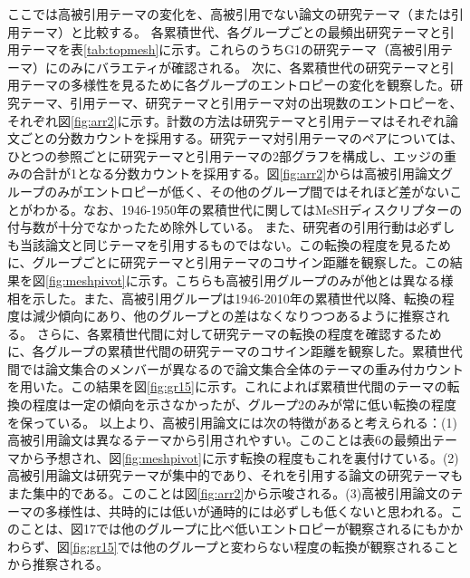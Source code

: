 ここでは高被引用テーマの変化を、高被引用でない論文の研究テーマ（または引用テーマ）と比較する。
各累積世代、各グループごとの最頻出研究テーマと引用テーマを表\ref{tab:topmesh}に示す。これらのうちG1の研究テーマ（高被引用テーマ）にのみにバラエティが確認される。
次に、各累積世代の研究テーマと引用テーマの多様性を見るために各グループのエントロピーの変化を観察した。研究テーマ、引用テーマ、研究テーマと引用テーマ対の出現数のエントロピーを、それぞれ図\ref{fig:arr2}に示す。計数の方法は研究テーマと引用テーマはそれぞれ論文ごとの分数カウントを採用する。研究テーマ対引用テーマのペアについては、ひとつの参照ごとに研究テーマと引用テーマの2部グラフを構成し、エッジの重みの合計が1となる分数カウントを採用する。図\ref{fig:arr2}からは高被引用論文グループのみがエントロピーが低く、その他のグループ間ではそれほど差がないことがわかる。なお、1946-1950年の累積世代に関してはMeSHディスクリプターの付与数が十分でなかったため除外している。
また、研究者の引用行動は必ずしも当該論文と同じテーマを引用するものではない。この転換の程度を見るために、グループごとに研究テーマと引用テーマのコサイン距離を観察した。この結果を図\ref{fig:meshpivot}に示す。こちらも高被引用グループのみが他とは異なる様相を示した。また、高被引用グループは1946-2010年の累積世代以降、転換の程度は減少傾向にあり、他のグループとの差はなくなりつつあるように推察される。
さらに、各累積世代間に対して研究テーマの転換の程度を確認するために、各グループの累積世代間の研究テーマのコサイン距離を観察した。累積世代間では論文集合のメンバーが異なるので論文集合全体のテーマの重み付カウントを用いた。この結果を図\ref{fig:gr15}に示す。これによれば累積世代間のテーマの転換の程度は一定の傾向を示さなかったが、グループ2のみが常に低い転換の程度を保っている。
以上より、高被引用論文には次の特徴があると考えられる：(1)高被引用論文は異なるテーマから引用されやすい。このことは表6の最頻出テーマから予想され、図\ref{fig:meshpivot}に示す転換の程度もこれを裏付けている。(2)高被引用論文は研究テーマが集中的であり、それを引用する論文の研究テーマもまた集中的である。このことは図\ref{fig:arr2}から示唆される。(3)高被引用論文のテーマの多様性は、共時的には低いが通時的には必ずしも低くないと思われる。このことは、図17では他のグループに比べ低いエントロピーが観察されるにもかかわらず、図\ref{fig:gr15}では他のグループと変わらない程度の転換が観察されることから推察される。
